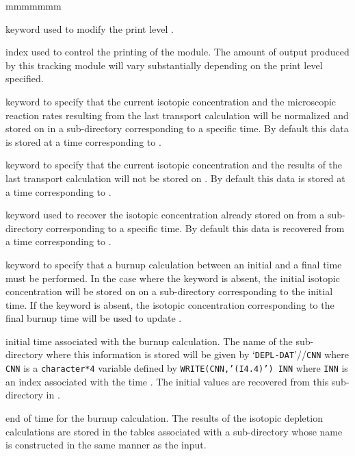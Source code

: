 \begin{ListeDeDescription}{mmmmmmm}

\item[\moc{EDIT}] keyword used to modify the print level .

\item[\dusa{iprint}] index used to control the printing of the module. The
amount of output produced by this tracking module will vary substantially
depending on the print level specified.

\item[\moc{SAVE}] keyword to specify that the current isotopic concentration
and the microscopic reaction rates resulting from the last transport calculation
will be normalized and stored on  in a sub-directory corresponding
to a specific time. By default this data is stored at a time corresponding to
.

\item[\moc{NOSA}] keyword to specify that the current isotopic concentration
and the results of the last transport calculation will not be stored on
. By default this data is stored at a time corresponding to
.

\item[\moc{SET}] keyword used to recover the isotopic concentration already
stored on  from a sub-directory corresponding to a specific time. By
default this data is recovered from a time corresponding to .

\item[\moc{DEPL}] keyword to specify that a burnup calculation between an
initial and a final time must be performed. In the case where the 
keyword is absent, the initial isotopic concentration will be stored on
 on a sub-directory corresponding to the initial time. If the
 keyword is absent, the isotopic concentration corresponding to the
final burnup time will be used to update .

\item[\dusa{xti}] initial time associated with the burnup calculation. The
name of the sub-directory where this information is stored will be given by
`{\tt DEPL-DAT}'//{\tt CNN} where {\tt CNN} is a  {\tt character*4} variable
defined by  {\tt WRITE(CNN,'(I4.4)') INN} where {\tt INN} is an index associated
with the time . The initial values  are recovered from this
sub-directory in .

\item[\dusa{xtf}] end of time for the burnup calculation. The results of the
isotopic depletion calculations are stored in the tables associated with a
sub-directory whose name is constructed in the same manner as the 
input.


\end{ListeDeDescription}
